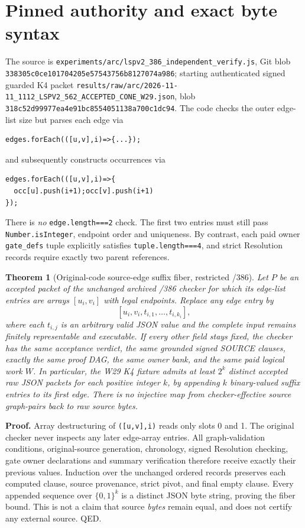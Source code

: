 \documentclass[11pt]{article}
\newtheorem{theorem}{Theorem}
\begin{document}
\section*{Pinned authority and exact byte syntax}
The source is \texttt{experiments/arc/lspv2\_386\_independent\_verify.js}, Git blob \texttt{338305c0ce101704205e57543756b8127074a986}; starting authenticated signed guarded K4 packet \texttt{results/raw/arc/2026-11-11\_1112\_LSPV2\_562\_ACCEPTED\_CONE\_W29.json}, blob \texttt{318c52d99977ea4e91bc8554051138a700c1dc94}. The code checks the outer edge-list size but parses each edge via
\begin{verbatim}
edges.forEach(([u,v],i)=>{...});
\end{verbatim}
and subsequently constructs occurrences via
\begin{verbatim}
edges.forEach(([u,v],i)=>{
  occ[u].push(i+1);occ[v].push(i+1)
});
\end{verbatim}
There is \emph{no} \texttt{edge.length===2} check. The first two entries must still pass \texttt{Number.isInteger}, endpoint order and uniqueness. By contrast, each paid owner \texttt{gate\_defs} tuple explicitly satisfies \texttt{tuple.length===4}, and strict Resolution records require exactly two parent references.

\begin{theorem}[Original-code source-edge suffix fiber, restricted /386]
Let $P$ be an accepted packet of the unchanged archived /386 checker for which its edge-list entries are arrays $[u_i,v_i]$ with legal endpoints. Replace any edge entry by
\[
 [u_i,v_i,t_{i,1},\ldots,t_{i,k_i}],
\]
where each $t_{i,j}$ is an arbitrary valid JSON value and the complete input remains finitely representable and executable. If every other field stays fixed, the checker has the same acceptance verdict, the same grounded signed SOURCE clauses, exactly the same proof DAG, the same owner bank, and the same paid logical work $W$. In particular, the W29 K4 fixture admits at least $2^k$ distinct accepted raw JSON packets for each positive integer $k$, by appending $k$ binary-valued suffix entries to its first edge. There is no injective map from checker-effective source graph-pairs back to raw source bytes.
\end{theorem}
\noindent\textbf{Proof.}
Array destructuring of \texttt{([u,v],i)} reads only slots 0 and 1. The original checker never inspects any later edge-array entries. All graph-validation conditions, original-source generation, chronology, signed Resolution checking, gate owner declarations and summary verification therefore receive exactly their previous values. Induction over the unchanged ordered records preserves each computed clause, source provenance, strict pivot, and final empty clause. Every appended sequence over $\{0,1\}^k$ is a distinct JSON byte string, proving the fiber bound. This is not a claim that source \emph{bytes} remain equal, and does not certify any external source. QED.
\end{document}
